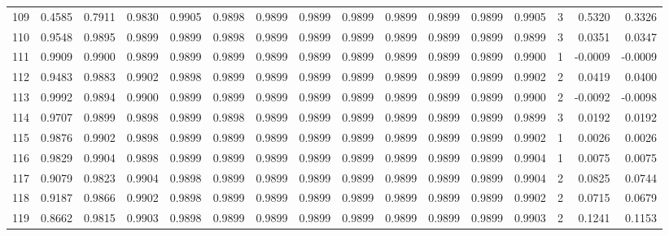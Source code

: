 \begin{tabular}{lrrrrrrrrrrrrrrr}
109 &      0.4585 &  0.7911 &  0.9830 &  0.9905 &  0.9898 &  0.9899 &  0.9899 &  0.9899 &  0.9899 &  0.9899 &   0.9899 &     0.9905 &      3 &                    0.5320 &                     0.3326 \\
110 &      0.9548 &  0.9895 &  0.9899 &  0.9899 &  0.9898 &  0.9899 &  0.9899 &  0.9899 &  0.9899 &  0.9899 &   0.9899 &     0.9899 &      3 &                    0.0351 &                     0.0347 \\
111 &      0.9909 &  0.9900 &  0.9899 &  0.9899 &  0.9899 &  0.9899 &  0.9899 &  0.9899 &  0.9899 &  0.9899 &   0.9899 &     0.9900 &      1 &                   -0.0009 &                    -0.0009 \\
112 &      0.9483 &  0.9883 &  0.9902 &  0.9898 &  0.9899 &  0.9899 &  0.9899 &  0.9899 &  0.9899 &  0.9899 &   0.9899 &     0.9902 &      2 &                    0.0419 &                     0.0400 \\
113 &      0.9992 &  0.9894 &  0.9900 &  0.9899 &  0.9899 &  0.9899 &  0.9899 &  0.9899 &  0.9899 &  0.9899 &   0.9899 &     0.9900 &      2 &                   -0.0092 &                    -0.0098 \\
114 &      0.9707 &  0.9899 &  0.9898 &  0.9899 &  0.9898 &  0.9899 &  0.9899 &  0.9899 &  0.9899 &  0.9899 &   0.9899 &     0.9899 &      3 &                    0.0192 &                     0.0192 \\
115 &      0.9876 &  0.9902 &  0.9898 &  0.9899 &  0.9899 &  0.9899 &  0.9899 &  0.9899 &  0.9899 &  0.9899 &   0.9899 &     0.9902 &      1 &                    0.0026 &                     0.0026 \\
116 &      0.9829 &  0.9904 &  0.9898 &  0.9899 &  0.9899 &  0.9899 &  0.9899 &  0.9899 &  0.9899 &  0.9899 &   0.9899 &     0.9904 &      1 &                    0.0075 &                     0.0075 \\
117 &      0.9079 &  0.9823 &  0.9904 &  0.9898 &  0.9899 &  0.9899 &  0.9899 &  0.9899 &  0.9899 &  0.9899 &   0.9899 &     0.9904 &      2 &                    0.0825 &                     0.0744 \\
118 &      0.9187 &  0.9866 &  0.9902 &  0.9898 &  0.9899 &  0.9899 &  0.9899 &  0.9899 &  0.9899 &  0.9899 &   0.9899 &     0.9902 &      2 &                    0.0715 &                     0.0679 \\
119 &      0.8662 &  0.9815 &  0.9903 &  0.9898 &  0.9899 &  0.9899 &  0.9899 &  0.9899 &  0.9899 &  0.9899 &   0.9899 &     0.9903 &      2 &                    0.1241 &                     0.1153 \\

\end{tabular}
